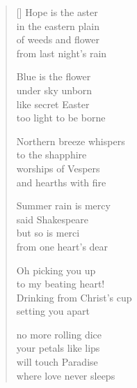 \documentclass[12pt,a4paper]{article}
\begin{document}
\thispagestyle{empty}

\poemtitle{}

\settowidth{\versewidth}{Drinking from Christ's cup}

\bigskip

\begin{verse}[\versewidth]
Hope is the aster \\
in the eastern plain \\
of weeds and flower \\
from last night's rain

Blue is the flower \\
under sky unborn \\
like secret Easter \\
too light to be borne

Northern breeze whispers \\
to the shapphire \\
worships of Vespers \\
and hearths with fire

Summer rain is mercy \\
said Shakespeare \\
but so is merci \\
from one heart's dear

Oh picking you up \\
to my beating heart! \\
Drinking from Christ's cup \\
setting you apart

no more rolling dice \\
your petals like lips \\
will touch Paradise \\
where love never sleeps
\end{verse}
\end{document}
